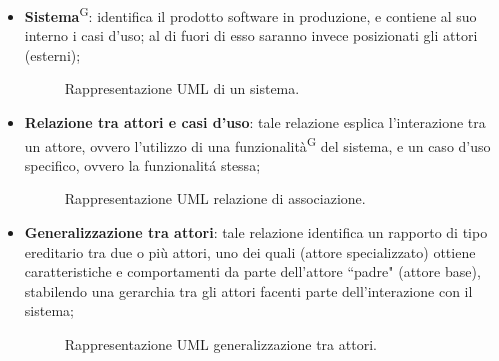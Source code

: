 \documentclass[8pt]{article}
\newcommand{\glossterm}[1]{#1\textsuperscript{G}} %
\begin{document}
\begin{itemize}
\item \glossterm{\textbf{Sistema}}: identifica il prodotto software in produzione, e contiene al suo interno i casi d'uso; al di fuori di esso saranno invece posizionati gli attori (esterni);
        \begin{figure}[H]
            \centering
            \caption{Rappresentazione UML di un sistema.}
            \label{fig:Rappresentazione UML di un sistema}
        \end{figure}
    \item \textbf{Relazione tra attori e casi d'uso}: tale relazione esplica l'interazione tra un attore, ovvero l'utilizzo di una \glossterm{funzionalità} del sistema, e un caso d'uso specifico, ovvero la funzionalitá stessa;
        \begin{figure}[H]
            \centering
            \caption{Rappresentazione UML relazione di associazione.}
            \label{fig:Rappresentazione UML relazione di associazione}
        \end{figure}
    \item \textbf{Generalizzazione tra attori}: tale relazione identifica un rapporto di tipo ereditario tra due o più attori, uno dei quali (attore specializzato) ottiene caratteristiche e comportamenti da parte dell'attore ``padre" (attore base), stabilendo una gerarchia tra gli attori facenti parte dell'interazione con il sistema;
        \begin{figure}[H]
            \centering
            \caption{Rappresentazione UML generalizzazione tra attori.}
            \label{fig:Rappresentazione UML generalizzazione tra attori}

\end{figure}
\end{itemize}
\end{document}
